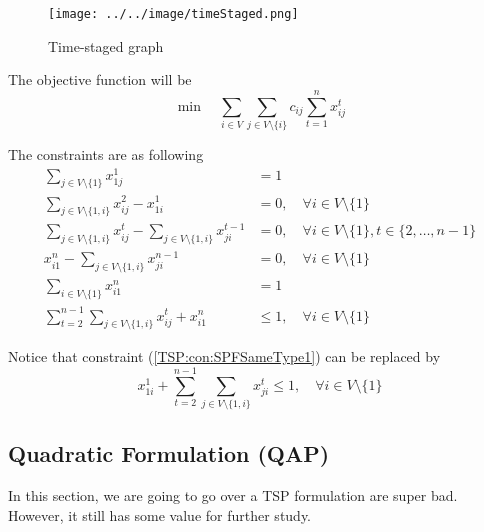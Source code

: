             \begin{figure}[!h]
                \centering
                \texttt{[image: ../../image/timeStaged.png]}
                \caption{Time-staged graph}
                \label{fig:timeStaged}
            \end{figure}

            The objective function will be
            \begin{equation}
                \min \quad \sum_{i \in V}\sum_{j \in V\setminus \{i\}} c_{ij} \sum_{t = 1}^n x_{ij}^t
            \end{equation}

            The constraints are as following
            \begin{align}
                \sum_{j \in V \setminus \{1\}} x_{1j}^1 &= 1 \label{TSP:con:SPFStart}\\
                \sum_{j \in V \setminus \{1, i\}} x_{ij}^2 - x_{1i}^1 &= 0, \quad \forall i \in V \setminus \{1\} \label{TSP:con:SPFFirstLayer}\\
                \sum_{j \in V \setminus \{1, i\}} x_{ij}^t - \sum_{j \in V \setminus \{1, i\}} x_{ji}^{t - 1} &= 0, \quad \forall i \in V \setminus \{1\}, t \in \{2, \dots, n - 1\} \label{TSP:con:SPFTthLayer}\\
                x_{i1}^n - \sum_{j \in V \setminus \{1, i\}} x_{ji}^{n - 1} &= 0, \quad \forall i \in V \setminus \{1\} \label{TSP:con:SPFLastLayer}\\
                \sum_{i \in V \setminus \{1\}} x_{i1}^n &= 1 \label{TSP:con:SPFEnd}\\
                \sum_{t = 2}^{n - 1}\sum_{j \in V \setminus \{1, i\}} x_{ij}^t + x_{i1}^n & \le 1, \quad \forall i \in V \setminus \{1\} \label{TSP:con:SPFSameType1}
            \end{align}

            Notice that constraint (\ref{TSP:con:SPFSameType1}) can be replaced by
            \begin{equation}
                x_{1i}^1 + \sum_{t = 2}^{n - 1}\sum_{j \in V \setminus \{1, i\}} x_{ji}^t \le 1, \quad \forall i \in V \setminus \{1\} \label{TSP:con:SPFSameType2}
            \end{equation}

        \subsection{Quadratic Formulation (QAP)}
            In this section, we are going to go over a TSP formulation are super bad. However, it still has some value for further study.

